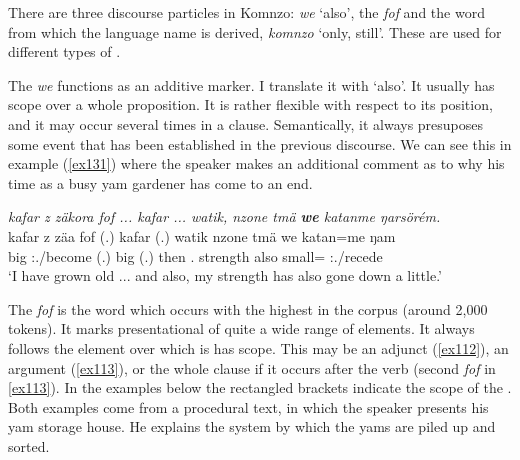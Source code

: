 There are three discourse particles in Komnzo: \emph{we} `also', the  \emph{fof} and the word from which the language name is derived, \emph{komnzo} `only, still'. These are used for different types of .%

The  \emph{we} functions as an additive  marker. I translate it with  `also'. It usually has scope over a whole proposition. It is rather flexible with respect to its position, and it may occur several times in a clause. Semantically, it always presuposes some event that has been established in the previous discourse. We can see this in example (\ref{ex131}) where the speaker makes an additional comment as to why his time as a busy yam gardener has come to an end.

\begin{exe}
	\ex \emph{kafar z zäkora fof ... kafar ... watik, nzone tmä \textbf{we} katanme ŋarsörém.}\\
	\gll kafar z zäa fof (.) kafar (.) watik nzone tmä we katan=me ŋam\\
	big \Iam{} \Fsg:\Pst.\Pfv/become \Emph{} (.) big (.) then \Fsg{}.\Poss{} strength also small=\Ins{} \Stsg:\Rpst.\Dur/recede\\
	\trans `I have grown old ... and also, my strength has also gone down a little.'\\ 
	\label{ex131}
\end{exe}

The  \emph{fof} is the word which occurs with the highest  in the corpus (around 2,000 tokens). It marks presentational  of quite a wide range of elements. It always follows the element over which is has scope. This may be an adjunct (\ref{ex112}), an argument (\ref{ex113}), or the whole clause if it occurs after the verb (second \emph{fof} in \ref{ex113}). In the examples below the rectangled brackets indicate the scope of the . Both examples come from a procedural text, in which the speaker presents his yam storage house. He explains the system by which the yams are piled up and sorted.

